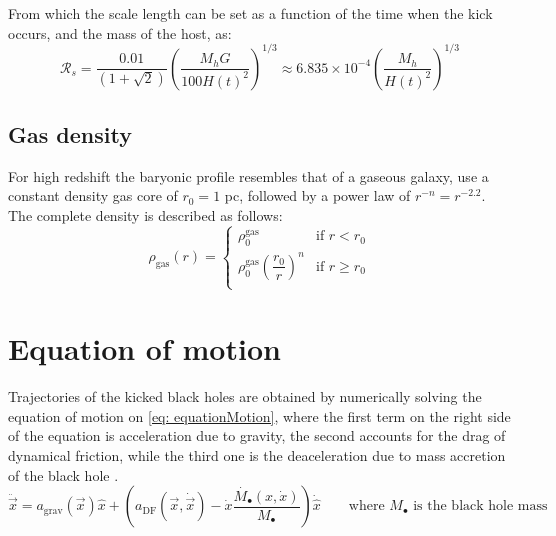 			From which the scale length can be set as a function of the time when the kick occurs, and the mass of the host, as:
			\begin{equation}
				\mathcal{R}_s = \dfrac{0.01}{\left(1 + \sqrt{2}\right)}\left({\dfrac{M_hG}{100 H(t)^2}}\right)^{1/3} \approx 6.835\times 10^{-4}\left({\dfrac{M_h}{H(t)^2}}\right)^{1/3}
			\end{equation}
		\subsection{Gas density}
			For high redshift the baryonic profile resembles that of a gaseous galaxy, \citeauthor{choksi2017recoiling} use a constant density gas core of $r_0 = 1$ pc, followed by a power law of $r^{-n} = r^{-2.2}$. The complete density is described as follows:
			\begin{equation}\label{eq: rdensity}
				\rho_\text{gas}(r) = \left \{
				\begin{matrix}
				\rho_0^\text{gas} & \text{if $r < r_0$}\\
				\rho_0^\text{gas}\left(\dfrac{r_0}{r}\right)^{n} & \text{if $r \geq r_0$}\\
				\end{matrix}
				\right.
			\end{equation}
	
	\section{Equation of motion}
		Trajectories of the kicked black holes are obtained by numerically solving the equation of motion on \autoref{eq: equationMotion}, where the first term on the right side of the equation is acceleration due to gravity, the second accounts for the drag of dynamical friction, while the third one is the deaceleration due to mass accretion of the black hole \cite{tanaka2009assembly, choksi2017recoiling}.
		\begin{equation}\label{eq: equationMotion}
			\ddot{\vec{x}} = a_\text{grav}(\vec{x})\hat{x} + \left(a_\text{DF}(\vec{x}, \dot{\vec{x}})-\dot{x}\dfrac{\dot{M_\bullet}(x, \dot{x})}{M_\bullet}\right)\dot{\hat{x}} \qquad \text{where $M_\bullet$ is the black hole mass}
		\end{equation}
		
